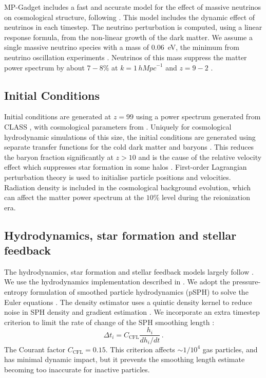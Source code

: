 \documentclass[fleqn,usenatbib]{mnras}
\newcommand{\hMpc}{\,h\unit{Mpc}^{-1}}
\begin{document}
MP-Gadget includes a fast and accurate model for the effect of massive neutrinos on cosmological structure, following \cite{Yacine:2013, Bird:2018}. This model includes the dynamic effect of neutrinos in each timestep. The neutrino perturbation is computed, using a linear response formula, from the non-linear growth of the dark matter.
We assume a single massive neutrino species with a mass of $0.06$~eV, the minimum from neutrino oscillation experiments \citep{deSalas:2018}. Neutrinos of this mass suppress the matter power spectrum by about $7-8\%$ at
$k = 1 \hMpc$ and $z=9 - 2$ \citep{Bird:2018}.

\subsection{Initial Conditions}

Initial conditions are generated at $z=99$ using a power spectrum generated from CLASS \cite{CLASS}, with cosmological parameters from \cite{Planck}. Uniquely for cosmological hydrodynamic simulations of this size, the initial conditions are generated using separate transfer functions for the cold dark matter and baryons \cite{Bird:2020}. This reduces the baryon fraction significantly at $z > 10$ and is the cause of the relative velocity effect which suppresses star formation in some halos \cite{Naoz:2007}. First-order Lagrangian perturbation theory \cite{Zeldovich:1970, Crocce:2006} is used to initialise particle positions and velocities. Radiation density is included in the cosmological background evolution, which can affect the matter power spectrum at the $10\%$ level during the reionization era.

\subsection{Hydrodynamics, star formation and stellar feedback}

The hydrodynamics, star formation and stellar feedback models largely follow \cite{Feng:2016}.
We use the hydrodynamics implementation described in \cite{2014MNRAS.440.1865F}.
We adopt the pressure-entropy formulation of smoothed particle hydrodynamics (pSPH) to solve the Euler equations \citep{2013MNRAS.428.2840H,2010MNRAS.405.1513R}.
The density estimator uses a quintic density kernel to reduce noise in SPH density and gradient estimation \citep{2012JCoPh.231..759P}. We incorporate an extra timestep criterion to limit the rate of change of the SPH smoothing length \cite{2020arXiv201003567S}:
\begin{equation}
    \Delta t_i = C_\mathrm{CFL} \frac{h_i}{d h_i / dt}\,.
\end{equation}
The Courant factor $C_\mathrm{CFL} = 0.15$. This criterion affects $\sim 1/10^{4}$ gas particles, and has minimal dynamic impact, but it prevents the smoothing length estimate becoming too inaccurate for inactive particles.
\end{document}
